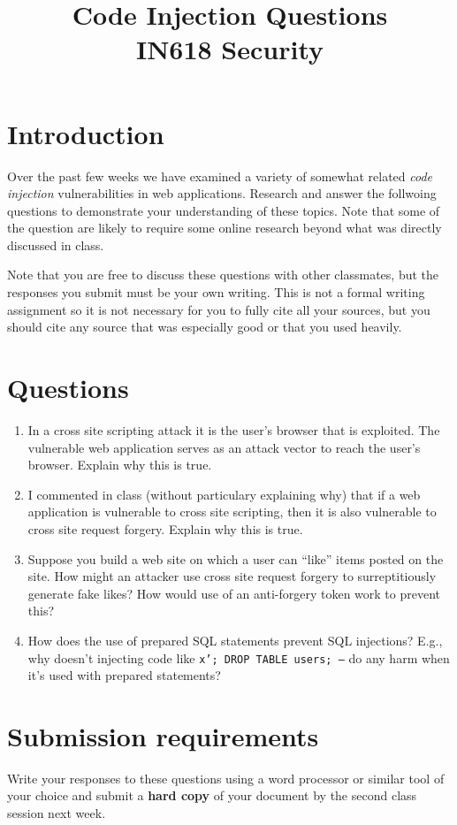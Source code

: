 \documentclass{article}
\begin{document}
\title{Code Injection Questions\\ IN618 Security}
\date{}
\maketitle

\section*{Introduction}
Over the past few weeks we have examined a variety of somewhat related \emph{code injection} vulnerabilities in web applications. Research and answer the follwoing questions to demonstrate your understanding of these topics. Note that some of the question are likely to require some online research beyond what was directly discussed in class.

Note that you are free to discuss these questions with other classmates, but the responses you submit must be your own writing. This is not a formal writing assignment so it is not necessary for you to fully cite all your sources, but you should cite any source that was especially good or that you used heavily.

\section*{Questions}

\begin{enumerate}
	\item In a cross site scripting attack it is the user's browser that is exploited.  The vulnerable web application serves as an attack vector to reach the user's browser. Explain why this is true.
	
	\item I commented in class (without particulary explaining why) that if a web application is vulnerable to cross site scripting, then it is also vulnerable to cross site request forgery.  Explain why this is true.
	
	\item Suppose you build a web site on which a user can ``like'' items posted on the site. How might an attacker use cross site request forgery to surreptitiously generate fake likes?  How would use of an anti-forgery token work to prevent this?
	
	\item How does the use of prepared SQL statements prevent SQL injections? E.g., why doesn't injecting code like \texttt{x'; DROP TABLE users; --} do any harm when it's used with prepared statements?
\end{enumerate}
\section*{Submission requirements}
Write your responses to these questions using a word processor or similar tool of your choice and submit a \textbf{hard copy} of your document by the second class session next week.
\end{document}
